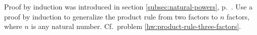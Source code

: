 Proof by induction was introduced in section \ref{subsec:natural-powers}, p.~\pageref{induction}.
Use a proof by induction to generalize the product rule from two factors to $n$ factors, where $n$
is any natural number.
 Cf.~problem \ref{hw:product-rule-three-factors}.
